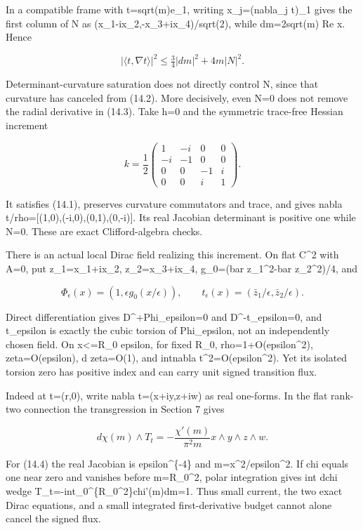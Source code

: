 \documentclass[
  10pt,
]{article}
\begin{document}
In a compatible frame with t=sqrt(m)e\_1, writing x\_j=(nabla\_j t)\_1
gives the first column of N as (x\_1-ix\_2,-x\_3+ix\_4)/sqrt(2), while
dm=2sqrt(m) Re x. Hence

\[
                 |\langle t,\nabla t\rangle|^2
                      \le\tfrac34|dm|^2+4m|N|^2.      \tag{14.3}
\]

Determinant-curvature saturation does not directly control N, since that
curvature has canceled from (14.2). More decisively, even N=0 does not
remove the radial derivative in (14.3). Take h=0 and the symmetric
trace-free Hessian increment

\[
k=\frac12\begin{pmatrix}
1&-i&0&0\\-i&-1&0&0\\0&0&-1&i\\0&0&i&1
\end{pmatrix}.
\]

It satisfies (14.1), preserves curvature commutators and trace, and
gives nabla t/rho={[}(1,0),(-i,0),(0,1),(0,-i){]}. Its real Jacobian
determinant is positive one while N=0. These are exact Clifford-algebra
checks.

There is an actual local Dirac field realizing this increment. On flat
C\^{}2 with A=0, put z\_1=x\_1+ix\_2, z\_2=x\_3+ix\_4, g\_0=(bar
z\_1\^{}2-bar z\_2\^{}2)/4, and

\[
 \Phi_\epsilon(x)=(1,\epsilon g_0(x/\epsilon)),\qquad
 t_\epsilon(x)=(\bar z_1/\epsilon,\bar z_2/\epsilon).
                                                               \tag{14.4}
\]

Direct differentiation gives D\^{}+Phi\_epsilon=0 and
D\^{}-t\_epsilon=0, and t\_epsilon is exactly the cubic torsion of
Phi\_epsilon, not an independently chosen field. On
\textbar x\textbar\textless=R\_0 epsilon, for fixed R\_0,
rho=1+O(epsilon\^{}2), \textbar zeta\textbar=O(epsilon), \textbar d
zeta\textbar=O(1), and int\textbar nabla t\textbar\^{}2=O(epsilon\^{}2).
Yet its isolated torsion zero has positive index and can carry unit
signed transition flux.

Indeed at t=(r,0), write nabla t=(x+iy,z+iw) as real one-forms. In the
flat rank-two connection the transgression in Section 7 gives

\[
        d\chi(m)\wedge T_t
             =-\frac{\chi'(m)}{\pi^2m}
                       x\wedge y\wedge z\wedge w.      \tag{14.5}
\]

For (14.4) the real Jacobian is epsilon\^{}\{-4\} and
m=\textbar x\textbar\^{}2/epsilon\^{}2. If chi equals one near zero and
vanishes before m=R\_0\^{}2, polar integration gives int dchi wedge
T\_t=-int\_0\^{}\{R\_0\^{}2\}chi'(m)dm=1. Thus small current, the two
exact Dirac equations, and a small integrated first-derivative budget
cannot alone cancel the signed flux.
\end{document}
